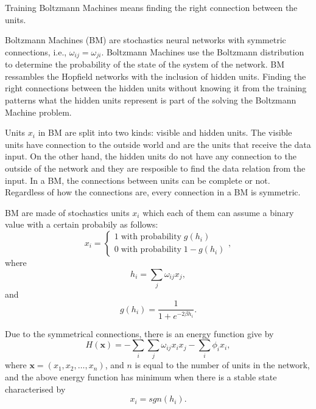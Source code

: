 Training Boltzmann Machines means finding the right connection between the units.

Boltzmann Machines (BM) are stochastics neural networks with symmetric connections, i.e., $\omega_{ij} = \omega_{ji}$.
Boltzmann Machines use the Boltzmann distribution to determine the probability of the state of the system of the network.
BM ressambles the Hopfield networks with the inclusion of hidden units.
Finding the right connections between the hidden units without knowing it from the training patterns what the hidden units represent is part of the solving the Boltzmann Machine problem.

Units $x_{i}$ in BM are split into two kinds: visible and hidden units.
The visible units have connection to the outside world and are the units that receive the data input.
On the other hand, the hidden units do not have any connection to the outside of the network and they are resposible to find the data relation from the input.
In a BM, the connections between units can be complete or not.
Regardless of how the connections are, every connection in a BM is symmetric.

BM are made of stochastics units $x_{i}$ which each of them can assume a binary value with a certain probabily as follows:
\begin{equation}
  x_{i} =
    \begin{cases}
      1 \; \text{with probability} \; g(h_{i}) \\
      0 \; \text{with probability} \; 1 - g(h_{i})
    \end{cases},
  \label{eq:eq1}
\end{equation}
where
\begin{equation}
  h_{i} = \sum_{j}\omega_{ij}x_{j},
  \label{eq:eq2}
\end{equation}
and
\begin{equation}
  g(h_{i}) = \frac{1}{1 + e^{-2 \beta h_{i}}}.
  \label{eq:eq3}
\end{equation}

Due to the symmetrical connections, there is an energy function give by
\begin{equation}
  H(\mathbf{x}) = - \sum_{i} \sum_{j} \omega_{ij}x_{i}x_{j} - \sum_{i} \phi_{i}x_{i},
  \label{eq:eq4}
\end{equation}
where $\mathbf{x} = (x_{1}, x_{2}, \dots, x_{n})$, and $n$ is equal to the number of units in the network, and the above energy function has minimum when there is a stable state characterised by
\begin{equation}
  x_{i} = sgn(h_{i}).
  \label{eq:eq5}
\end{equation}

